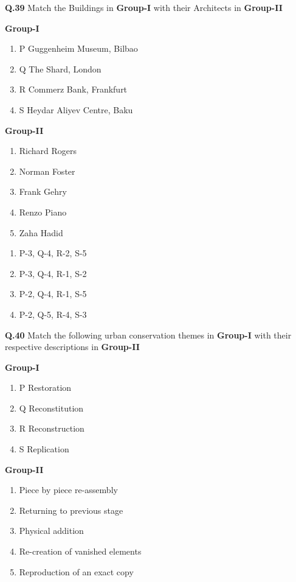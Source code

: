 \documentclass[journal,12pt,onecolumn]{IEEEtran}
\theoremstyle{remark}
\begin{document}
\noindent
\textbf{Q.39} Match the Buildings in \textbf{Group-I} with their Architects in \textbf{Group-II}
\begin{multicols}{2}
    

\textbf{Group-I}
\begin{enumerate}[label=\Alph*., leftmargin=1.5cm]
\item P Guggenheim Museum, Bilbao
\item Q The Shard, London
\item R Commerz Bank, Frankfurt
\item S Heydar Aliyev Centre, Baku
\end{enumerate}
\columnbreak
\noindent
\hspace{1cm}
\textbf{Group-II}
\begin{enumerate}[label=\arabic*., leftmargin=1.5cm]
\item Richard Rogers
\item Norman Foster
\item Frank Gehry
\item Renzo Piano
\item Zaha Hadid
\end{enumerate}
\end{multicols}

\begin{multicols}{2}
\begin{enumerate}[label=(\Alph*)]
\item P-3, Q-4, R-2, S-5
\item P-3, Q-4, R-1, S-2
\item P-2, Q-4, R-1, S-5
\item P-2, Q-5, R-4, S-3
\end{enumerate}
\end{multicols}

\vspace{1cm}

\noindent
\textbf{Q.40} Match the following urban conservation themes in \textbf{Group-I} with their respective descriptions in \textbf{Group-II}
\begin{multicols}{2}
    

\textbf{Group-I}
\begin{enumerate}[label=\Alph*., leftmargin=1.5cm]
\item P Restoration
\item Q Reconstitution
\item R Reconstruction
\item S Replication
\end{enumerate}
\columnbreak\noindent\hspace{1cm}
\textbf{Group-II}
\begin{enumerate}[label=\arabic*., leftmargin=1.5cm]
\item Piece by piece re-assembly
\item Returning to previous stage
\item Physical addition
\item Re-creation of vanished elements
\item Reproduction of an exact copy
\end{enumerate}
\end{multicols}
\end{document}
